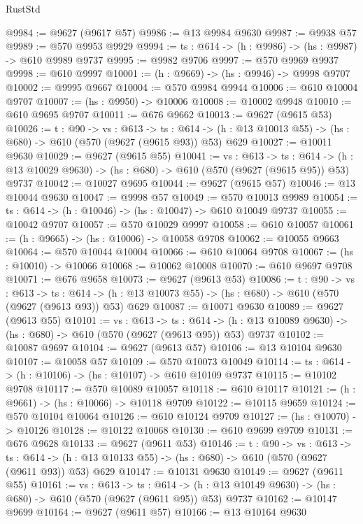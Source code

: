 \begin{lexlean}{RustStd}
\begin{coremodule}
@9984 := @9627 (@9617 @57)
@9986 := @13 @9984 @9630
@9987 := @9938 @57
@9989 := @570 @9953 @9929
@9994 := {ts : @614} -> (h : @9986) -> (hs : @9987) -> @610 @9989 @9737
@9995 := @9982 @9706
@9997 := @570 @9969 @9937
@9998 := @610 @9997
@10001 := (h : @9669) -> (hs : @9946) -> @9998 @9707
@10002 := @9995 @9667
@10004 := @570 @9984 @9944
@10006 := @610 @10004 @9707
@10007 := (hs : @9950) -> @10006
@10008 := @10002 @9948
@10010 := @610 @9695 @9707
@10011 := @676 @9662
@10013 := @9627 (@9615 @53)
@10026 := {t : @90} ->
  {vs : @613} ->
  {ts : @614} -> (h : @13 @10013 @55) -> (hs : @680) -> @610 (@570 (@9627 (@9615 @93)) @53) @629
@10027 := @10011 @9630
@10029 := @9627 (@9615 @55)
@10041 := {vs : @613} ->
  {ts : @614} -> (h : @13 @10029 @9630) -> (hs : @680) -> @610 (@570 (@9627 (@9615 @95)) @53) @9737
@10042 := @10027 @9695
@10044 := @9627 (@9615 @57)
@10046 := @13 @10044 @9630
@10047 := @9998 @57
@10049 := @570 @10013 @9989
@10054 := {ts : @614} -> (h : @10046) -> (hs : @10047) -> @610 @10049 @9737
@10055 := @10042 @9707
@10057 := @570 @10029 @9997
@10058 := @610 @10057
@10061 := (h : @9665) -> (hs : @10006) -> @10058 @9708
@10062 := @10055 @9663
@10064 := @570 @10044 @10004
@10066 := @610 @10064 @9708
@10067 := (hs : @10010) -> @10066
@10068 := @10062 @10008
@10070 := @610 @9697 @9708
@10071 := @676 @9658
@10073 := @9627 (@9613 @53)
@10086 := {t : @90} ->
  {vs : @613} ->
  {ts : @614} -> (h : @13 @10073 @55) -> (hs : @680) -> @610 (@570 (@9627 (@9613 @93)) @53) @629
@10087 := @10071 @9630
@10089 := @9627 (@9613 @55)
@10101 := {vs : @613} ->
  {ts : @614} -> (h : @13 @10089 @9630) -> (hs : @680) -> @610 (@570 (@9627 (@9613 @95)) @53) @9737
@10102 := @10087 @9697
@10104 := @9627 (@9613 @57)
@10106 := @13 @10104 @9630
@10107 := @10058 @57
@10109 := @570 @10073 @10049
@10114 := {ts : @614} -> (h : @10106) -> (hs : @10107) -> @610 @10109 @9737
@10115 := @10102 @9708
@10117 := @570 @10089 @10057
@10118 := @610 @10117
@10121 := (h : @9661) -> (hs : @10066) -> @10118 @9709
@10122 := @10115 @9659
@10124 := @570 @10104 @10064
@10126 := @610 @10124 @9709
@10127 := (hs : @10070) -> @10126
@10128 := @10122 @10068
@10130 := @610 @9699 @9709
@10131 := @676 @9628
@10133 := @9627 (@9611 @53)
@10146 := {t : @90} ->
  {vs : @613} ->
  {ts : @614} -> (h : @13 @10133 @55) -> (hs : @680) -> @610 (@570 (@9627 (@9611 @93)) @53) @629
@10147 := @10131 @9630
@10149 := @9627 (@9611 @55)
@10161 := {vs : @613} ->
  {ts : @614} -> (h : @13 @10149 @9630) -> (hs : @680) -> @610 (@570 (@9627 (@9611 @95)) @53) @9737
@10162 := @10147 @9699
@10164 := @9627 (@9611 @57)
@10166 := @13 @10164 @9630

\end{coremodule}
\end{lexlean}
